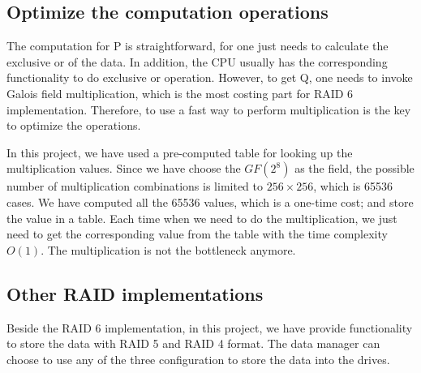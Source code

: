 \subsection{Optimize the computation operations}

The computation for P is straightforward, for one just needs to calculate the exclusive or of the data. In addition, the CPU usually has the corresponding functionality to do exclusive or operation. However, to get Q, one needs to invoke Galois field multiplication, which is the most costing part for RAID 6 implementation. Therefore, to use a fast way to perform multiplication is the key to optimize the operations. 

In this project, we have used a pre-computed table for looking up the multiplication values. Since we have choose the $GF(2^8)$ as the field, the possible number of multiplication combinations is limited to $256 \times 256$, which is 65536 cases. We have computed all the 65536 values, which is a one-time cost; and store the value in a table. Each time when we need to do the multiplication, we just need to get the corresponding value from the table with the time complexity $O(1)$. The multiplication is not the bottleneck anymore.

\subsection{Other RAID implementations}

Beside the RAID 6 implementation, in this project, we have provide functionality to store the data with RAID 5 and RAID 4 format. The data manager can choose to use any of the three configuration to store the data into the drives.
